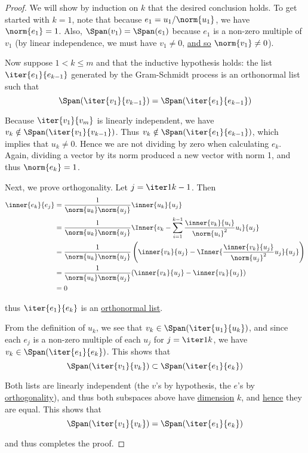 \begin{proof}
  We will show by induction on $k$ that the desired conclusion holds. To get
  started with $k=1$, note that because $e_1=u_1/\norm{u_1}$, we have
  $\norm{e_1}=1$. Also, $\Span(v_1)=\Span(e_1)$ because $e_1$ is a non-zero
  multiple of $v_1$ (by linear independence, we must have $v_1\neq0$,
  \href{e0fff96}{and so} $\norm{v_1}\neq0$).

  Now suppose $1<k\leq m$ and that the inductive hypothesis holds: the list
  $\iter{e_1}{e_{k-1}}$ generated by the Gram-Schmidt process is an orthonormal
  list such that
  $$
    \Span(\iter{v_1}{v_{k-1}})=\Span(\iter{e_1}{e_{k-1}})
  $$

  Because $\iter{v_1}{v_m}$ is linearly independent, we have
  $v_k\notin\Span(\iter{v_1}{v_{k-1}})$. Thus
  $v_k\notin\Span(\iter{e_1}{e_{k-1}})$, which implies that $u_k\neq0$. Hence
  we are not dividing by zero when calculating $e_k$. Again, dividing a vector
  by its norm produced a new vector with norm 1, and thus $\norm{e_k}=1$.

  Next, we prove orthogonality. Let $j=\iter1{k-1}$. Then
  \begin{align*}
    \inner{e_k}{e_j} &=\frac1{\norm{u_k}\norm{u_j}}\inner{u_k}{u_j}                                                                    \\
                     &=\frac1{\norm{u_k}\norm{u_j}}\Inner{v_k-\sum_{i=1}^{k-1}\frac{\inner{v_k}{u_i}}{\norm{u_i}^2}u_i}{u_j}           \\
                     &=\frac1{\norm{u_k}\norm{u_j}}\left(\inner{v_k}{u_j}-\Inner{\frac{\inner{v_k}{u_j}}{\norm{u_j}^2}u_j}{u_j}\right) \\
                     &=\frac1{\norm{u_k}\norm{u_j}}(\inner{v_k}{u_j}-\inner{v_k}{u_j})                                                 \\
                     &=0
  \end{align*}

  thus $\iter{e_1}{e_k}$ is an \href{d90fcb1}{orthonormal list}.

  From the definition of $u_k$, we see that $v_k\in\Span(\iter{u_1}{u_k})$, and
  since each $e_j$ is a non-zero multiple of each $u_j$ for $j=\iter1k$, we
  have $v_k\in\Span(\iter{e_1}{e_k})$. This shows that
  $$
    \Span(\iter{v_1}{v_k})\subset\Span(\iter{e_1}{e_k})
  $$

  Both lists are linearly independent (the $v$'s by hypothesis, the $e$'s by
  \href{c0eb6f5}{orthogonality}), and thus both subspaces above have
  \href{cd4284b}{dimension} $k$, and \href{ed8951d}{hence} they are equal. This
  shows that
  $$
    \Span(\iter{v_1}{v_k})=\Span(\iter{e_1}{e_k})
  $$

  and thus completes the proof.
\end{proof}

